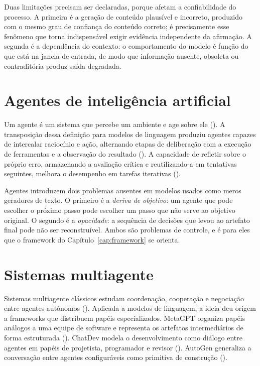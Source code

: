 Duas limitações precisam ser declaradas, porque afetam a confiabilidade do
processo. A primeira é a geração de conteúdo plausível e incorreto, produzido com
o mesmo grau de confiança do conteúdo correto; é precisamente esse fenômeno que
torna indispensável exigir evidência independente da afirmação. A segunda é a
dependência do contexto: o comportamento do modelo é função do que está na janela
de entrada, de modo que informação ausente, obsoleta ou contraditória produz
saída degradada.

\section{Agentes de inteligência artificial}
\label{sec:agentes}

Um agente é um sistema que percebe um ambiente e age sobre ele
(). A transposição dessa definição para modelos de
linguagem produziu agentes capazes de intercalar raciocínio e ação, alternando
etapas de deliberação com a execução de ferramentas e a observação do resultado
(). A capacidade de refletir sobre o próprio erro,
armazenando a avaliação crítica e reutilizando-a em tentativas seguintes,
melhora o desempenho em tarefas iterativas ().

Agentes introduzem dois problemas ausentes em modelos usados como meros
geradores de texto. O primeiro é a \emph{deriva de objetivo}: um agente que pode
escolher o próximo passo pode escolher um passo que não serve ao objetivo
original. O segundo é a \emph{opacidade}: a sequência de decisões que levou ao
artefato final pode não ser reconstruível. Ambos são problemas de controle, e é
para eles que o framework do Capítulo~\ref{cap:framework} se orienta.

\section{Sistemas multiagente}
\label{sec:multiagente}

Sistemas multiagente clássicos estudam coordenação, cooperação e negociação entre
agentes autônomos (). Aplicada a modelos de linguagem,
a ideia deu origem a frameworks que distribuem papéis especializados. MetaGPT
organiza papéis análogos a uma equipe de software e representa os artefatos
intermediários de forma estruturada (). ChatDev
modela o desenvolvimento como diálogo entre agentes em papéis de projetista,
programador e revisor (). AutoGen generaliza a
conversação entre agentes configuráveis como primitiva de construção
().


